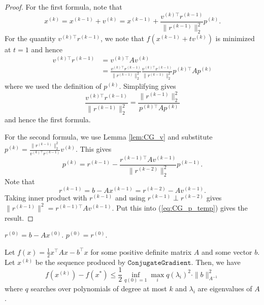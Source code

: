 \begin{proof}
For the first formula, note that
\[
x^{(k)}=x^{(k-1)}+v^{(k)}=x^{(k-1)}+\frac{v^{(k)\top}r^{(k-1)}}{\|r^{(k-1)}\|_{2}^{2}}p^{(k)}.
\]
For the quantity $v^{(k)\top}r^{(k-1)}$, we note that $f(x^{(k-1)}+tv^{(k)})$
is minimized at $t=1$ and hence
\begin{align*}
v^{(k)\top}r^{(k-1)} & =v^{(k)\top}Av^{(k)}\\
 & =\frac{v^{(k)\top}r^{(k-1)}}{\|r^{(k-1)}\|_{2}^{2}}\frac{v^{(k)\top}r^{(k-1)}}{\|r^{(k-1)}\|_{2}^{2}}p^{(k)\top}Ap^{(k)}
\end{align*}
where we used the definition of $p^{(k)}$. Simplifying gives
\[
\frac{v^{(k)\top}r^{(k-1)}}{\|r^{(k-1)}\|_{2}^{2}}=\frac{\|r^{(k-1)}\|_{2}^{2}}{p^{(k)\top}Ap^{(k)}}
\]
and hence the first formula.

For the second formula, we use Lemma \ref{lem:CG_v} and substitute
$p^{(k)}=\frac{\|r^{(k-1)}\|_{2}^{2}}{v^{(k)\top}r^{(k-1)}}v^{(k)}$.
This gives
\begin{equation}
p^{(k)}=r^{(k-1)}-\frac{r^{(k-1)\top}Av^{(k-1)}}{\|r^{(k-2)}\|_{2}^{2}}p^{(k-1)}.\label{eq:CG_p_temp}
\end{equation}
Note that
\[
r^{(k-1)}=b-Ax^{(k-1)}=r^{(k-2)}-Av^{(k-1)}.
\]
Taking inner product with $r^{(k-1)}$ and using $r^{(k-1)}\perp r^{(k-2)}$
gives $\|r^{(k-1)}\|^{2}=r^{(k-1)\top}Av^{(k-1)}$. Put this into
(\ref{eq:CG_p_temp}) gives the result.
\end{proof}
\begin{algorithm2e}[H]

\caption{$\mathtt{ConjugateGradient}$ (CG)}

\SetAlgoLined

$r^{(0)}=b-Ax^{(0)}$. $p^{(0)}=r^{(0)}$.


\end{algorithm2e}
\begin{thm}
\label{thm:CG}Let $f(x)=\frac{1}{2}x^{\top}Ax-b^{\top}x$ for some
positive definite matrix $A$ and some vector $b$. Let $x^{(k)}$
be the sequence produced by $\mathtt{ConjugateGradient}$. Then, we
have
\[
f(x^{(k)})-f(x^{*})\leq\frac{1}{2}\inf_{q(0)=1}\max_{i}q(\lambda_{i})^{2}\cdot\|b\|_{A^{-1}}^{2}
\]
where $q$ searches over polynomials of degree at most $k$ and $\lambda_{i}$
are eigenvalues of $A$.
\end{thm}


